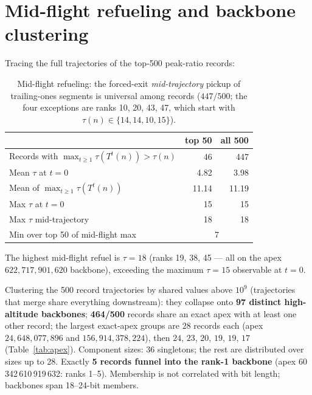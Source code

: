 \documentclass[11pt]{article}
\theoremstyle{remark}
\newcommand{\T}{T}
\newcommand{\rankOneApex}{60\,342\,610\,919\,632}
\begin{document}
\section{Mid-flight refueling and backbone clustering}
\label{sec:refuel}
Tracing the full trajectories of the top-500 peak-ratio records:

\begin{table}[t]
\centering
\begin{tabular}{@{}lrr@{}}
\toprule
 & top 50 & all 500 \\
\midrule
Records with $\max_{t \ge 1}\tau(\T^t(n)) > \tau(n)$ & 46 & 447 \\
Mean $\tau$ at $t = 0$ & 4.82 & 3.98 \\
Mean of $\max_{t \ge 1} \tau(\T^t(n))$ & 11.14 & 11.19 \\
Max $\tau$ at $t = 0$ & 15 & 15 \\
Max $\tau$ mid-trajectory & 18 & 18 \\
Min over top 50 of mid-flight max & \multicolumn{2}{c}{7} \\
\bottomrule
\end{tabular}
\caption{Mid-flight refueling: the forced-exit \emph{mid-trajectory}
pickup of trailing-ones segments is universal among records ($447/500$;
the four exceptions are ranks 10, 20, 43, 47, which start with
$\tau(n) \in \{14, 14, 10, 15\}$).}
\label{tab:refuel}
\end{table}

The highest mid-flight refuel is $\tau = 18$ (ranks 19, 38, 45 --- all on
the apex $622{,}717{,}901{,}620$ backbone), exceeding the maximum $\tau =
15$ observable at $t = 0$.

Clustering the 500 record trajectories by shared values above $10^9$
(trajectories that merge share everything downstream): they collapse onto
\textbf{97 distinct high-altitude backbones}; \textbf{464/500} records
share an exact apex with at least one other record; the largest exact-apex
groups are $28$ records each (apex $24{,}648{,}077{,}896$ and
$156{,}914{,}378{,}224$), then $24$, $23$, $20$, $19$, $19$, $17$
(Table~\ref{tab:apex}). Component sizes: 36 singletons; the rest are
distributed over sizes up to 28. Exactly \textbf{5 records funnel into the
rank-1 backbone} (apex \rankOneApex: ranks 1--5). Membership is not
correlated with bit length; backbones span 18--24-bit members.
\end{document}
